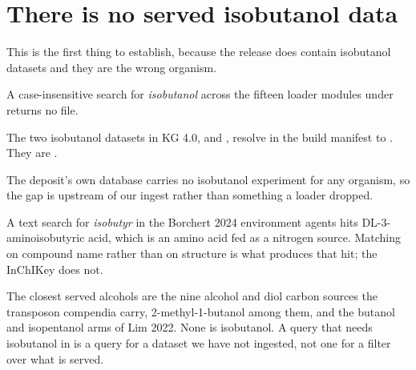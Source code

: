 
\section{There is no served  isobutanol data}\label{sec:isobutanol}

This is the first thing to establish, because the release does contain isobutanol
datasets and they are the wrong organism.

 A case-insensitive search for \emph{isobutanol} across the
fifteen loader modules under  returns no file.

 The two isobutanol datasets in KG 4.0,
 and , resolve
in the build manifest to . They are
.

 The deposit's own database carries no isobutanol
experiment for any organism, so the gap is upstream of our ingest rather than something
a loader dropped.

 A text search for \emph{isobutyr} in the
Borchert 2024 environment agents hits DL-3-aminoisobutyric acid, which is an amino acid
fed as a nitrogen source. Matching on compound name rather than on structure is what
produces that hit; the InChIKey does not.

The closest served alcohols are the nine alcohol and diol carbon sources the transposon
compendia carry, 2-methyl-1-butanol among them, and the butanol and isopentanol arms of
Lim 2022. None is isobutanol. A query that needs isobutanol in  is a
query for a dataset we have not ingested, not one for a filter over what is served.
